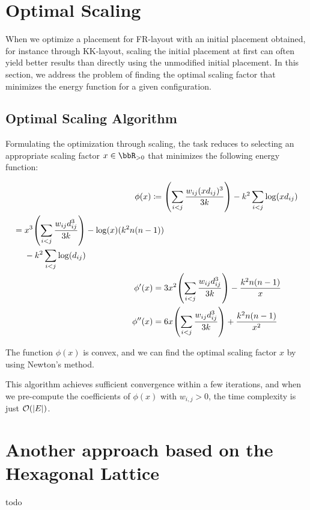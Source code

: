\documentclass[dvipdfmx,journal]{IEEEtran}
\newcommand{\defeq}{\coloneqq}
\begin{document}
\appendices

\section{Optimal Scaling}

When we optimize a placement for FR-layout with an initial placement obtained, for instance through KK-layout, scaling the initial placement at first can often yield better results than directly using the unmodified initial placement.
In this section, we address the problem of finding the optimal scaling factor that minimizes the energy function for a given configuration.

\subsection{Optimal Scaling Algorithm}

Formulating the optimization through scaling, the task reduces to selecting an appropriate scaling factor $x \in \bbR_{> 0}$ that minimizes the following energy function:

\begin{align*}
  \phi(x) \defeq {} & \qty(\sum_{i < j} \frac{w_{ij} (xd_{ij})^3}{3k}) - k^2 \sum_{i < j} \log(x d_{ij})                                    \\
  \begin{split}
    = {} & x^3 \qty(\sum_{i < j} \frac{w_{ij} d_{ij}^3}{3k}) - \log(x)(k^2 n(n-1))\\
    & - k^2 \sum_{i < j} \log(d_{ij})
  \end{split} \\
  \phi'(x) = {}     & 3x^2 \qty(\sum_{i < j} \frac{w_{ij} d_{ij}^3}{3k}) - \frac{k^2 n(n-1)}{x}                                             \\
  \phi''(x) = {}    & 6x \qty(\sum_{i < j} \frac{w_{ij} d_{ij}^3}{3k}) + \frac{k^2 n(n-1)}{x^2}
\end{align*}

The function $\phi(x)$ is convex, and we can find the optimal scaling factor $x$ by using Newton's method.

This algorithm achieves sufficient convergence within a few iterations, and when we pre-compute the coefficients of $\phi(x)$ with $w_{i,j} > 0$, the time complexity is just $\order{\abs{E}}$.

\section{Another approach based on the Hexagonal Lattice}

todo
\end{document}
